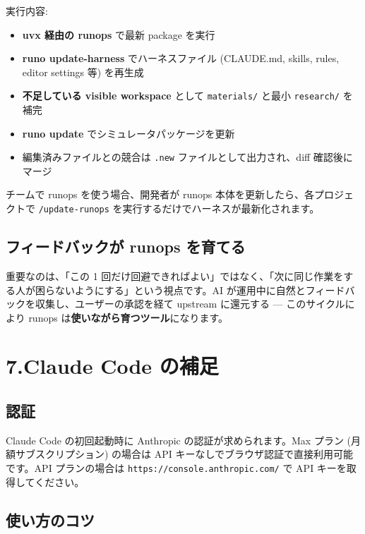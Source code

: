 \documentclass[a4paper,11pt]{article}
\begin{document}
実行内容:
\begin{itemize}[nosep]
  \item \textbf{uvx 経由の runops} で最新 package を実行
  \item \textbf{runo update-harness} でハーネスファイル (CLAUDE.md, skills, rules, editor settings 等) を再生成
  \item \textbf{不足している visible workspace} として \texttt{materials/} と最小 \texttt{research/} を補完
  \item \textbf{runo update} でシミュレータパッケージを更新
  \item 編集済みファイルとの競合は \texttt{.new} ファイルとして出力され、diff 確認後にマージ
\end{itemize}

チームで runops を使う場合、開発者が runops 本体を更新したら、各プロジェクトで \texttt{/update-runops} を実行するだけでハーネスが最新化されます。

\subsection*{\color{accent} フィードバックが runops を育てる}

重要なのは、「この 1 回だけ回避できればよい」ではなく、「次に同じ作業をする人が困らないようにする」という視点です。AI が運用中に自然とフィードバックを収集し、ユーザーの承認を経て upstream に還元する --- このサイクルにより runops は\textbf{使いながら育つツール}になります。

\section*{\color{darkblue} 7.\quad Claude Code の補足}

\subsection*{\color{accent} 認証}

Claude Code の初回起動時に Anthropic の認証が求められます。Max プラン (月額サブスクリプション) の場合は API キーなしでブラウザ認証で直接利用可能です。API プランの場合は \texttt{https://console.anthropic.com/} で API キーを取得してください。

\subsection*{\color{accent} 使い方のコツ}
\end{document}
